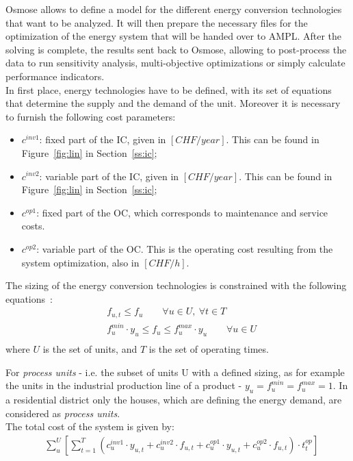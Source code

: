 \documentclass{article}
\begin{document}
Osmose allows to define a model for the different energy conversion technologies that want to be analyzed. It will then prepare the necessary files for the optimization of the energy system that will be handed over to AMPL. After the solving is complete, the results sent back to Osmose, allowing to post-process the data to run sensitivity analysis, multi-objective optimizations or simply calculate performance indicators.\\

In first place, energy technologies have to be defined, with its set of equations that determine the supply and the demand of the unit. Moreover it is necessary to furnish the following cost parameters:
\begin{itemize}
	\item $c^{inv1}$: fixed part of the IC, given in $[CHF/year]$. This can be found in Figure~\ref{fig:lin} in Section~\ref{ss:ic};
	\item $c^{inv2}$: variable part of the IC, given in $[CHF/year]$. This can be found in Figure~\ref{fig:lin} in Section~\ref{ss:ic};
	\item $c^{op1}$: fixed part of the OC, which corresponds to maintenance and service costs. 
	\item $c^{op2}$: variable part of the OC. This is the operating cost resulting from the system optimization, also in $[CHF/h]$.
\end{itemize}

The sizing of the energy conversion technologies is constrained with the following equations~\cite{suciuEnergyIntegrationCO22018}:
\begin{align}
& f_{u,t} \leq f_{u} \qquad \forall u \in U, \ \forall t \in T  \\
& f_{u}^{min} \cdot y_{u} \leq f_{u} \leq f_{u}^{max} \cdot y_{u} \qquad \forall u \in U\\
\end{align}
where $U$ is the set of units, and $T$ is the set of operating times.

For \textit{process units} - i.e. the subset of units U with a defined sizing, as for example the units in the industrial production line of a product - $y_{u} = f_{u}^{min} = f_{u}^{max} = 1$. In a residential district only the houses, which are defining the energy demand, are considered as \textit{process units}.\\

The total cost of the system is given by:
\begin{align}
& \sum_{u}^{U} \left[ \sum_{t = 1}^{T} \left( c_{u}^{inv1} \cdot y_{u,t} + c_{u}^{inv2} \cdot f_{u,t} + c_{u}^{op1} \cdot y_{u,t} + c_{u}^{op2} \cdot f_{u,t} \right) \cdot t_{t}^{op} \right] \\
\end{align}
\end{document}
